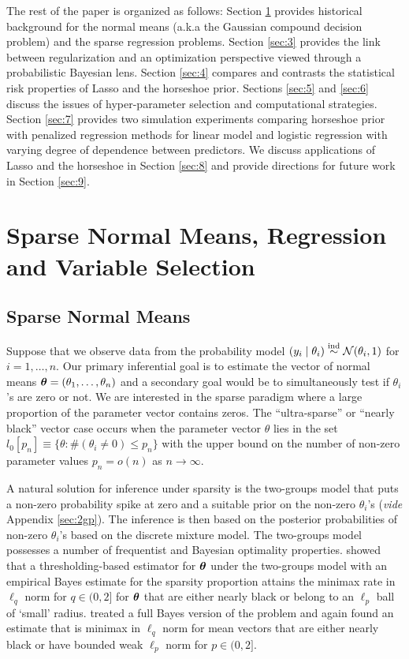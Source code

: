 \documentclass[sts,preprint]{imsart}
\begin{document}
The rest of the paper is organized as follows: Section \ref{sec:2} provides historical background for the normal means (a.k.a the Gaussian compound decision problem) and the sparse regression problems. 
Section \ref{sec:3} provides the link between regularization and an optimization perspective viewed through a probabilistic Bayesian lens. Section \ref{sec:4} compares and contrasts the statistical risk properties of Lasso and the horseshoe prior. Sections \ref{sec:5} and \ref{sec:6} discuss the issues of hyper-parameter selection and computational strategies. Section \ref{sec:7} provides two simulation experiments comparing horseshoe prior with penalized regression methods for linear model and logistic regression with varying degree of dependence between predictors. We discuss applications of Lasso and the horseshoe in Section \ref{sec:8} and provide directions for future work in Section \ref{sec:9}. 


\section{Sparse Normal Means, Regression and Variable Selection}\label{sec:2}

\subsection{Sparse Normal Means} Suppose that we observe data from the probability model $(y_i \mid \theta_i)  \stackrel{\mathrm{ind}}{\sim} {\cal N} (\theta_i,1)$ for $i = 1, \ldots, n$. Our primary inferential goal is to estimate the vector of normal means $ \boldsymbol{\theta} = ( \theta_1, \ldots , \theta_n )$ and a secondary goal would be to simultaneously test if $\theta_i$'s are zero or not. We are interested in the sparse paradigm where a large proportion of the parameter
vector contains zeros.  The ``ultra-sparse'' or ``nearly black'' vector case occurs when the parameter vector $\theta$ lies in the set $ l_0[ p_n] \equiv \{ \theta : \# ( \theta_i \neq 0 ) \leq p_n \} $ with the upper bound on the number of non-zero parameter values $ p_n = o(n) $ as $ n \to \infty$. 

A natural solution for inference under sparsity is the two-groups model that puts a non-zero probability spike at zero and a suitable prior on the non-zero $\theta_i$'s (\textit{vide} Appendix \ref{sec:2gp}). The inference is then based on the posterior probabilities of non-zero $\theta_i$'s based on the discrete mixture model. The two-groups model possesses a number of frequentist and Bayesian optimality properties. \cite{johnstone2004needles} showed that a thresholding-based
estimator for $\boldsymbol{\theta}$ under the two-groups model with an empirical Bayes estimate for the sparsity proportion attains the minimax rate in $\ell_q$ norm for $q \in (0,2]$ for $\boldsymbol{\theta}$ that are either nearly black or belong to an $\ell_p$ ball of `small' radius. \cite{castillo2012needles} treated a full Bayes version of the problem and again found an estimate that is minimax in $\ell_q$ norm for mean vectors that are either nearly black or have bounded weak $\ell_p$ norm for $p \in (0,2]$. 
\end{document}
